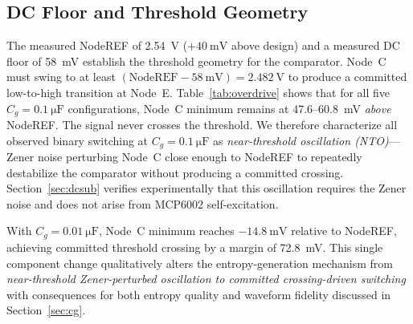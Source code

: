 \documentclass[conference]{IEEEtran}
\newcommand{\Cg}{\ensuremath{C_g}}
\begin{document}
\subsection{DC Floor and Threshold Geometry}


The measured NodeREF of \SI{2.54}{\volt} ($+\SI{40}{\milli\volt}$
above design) and a measured DC floor of \SI{58}{\milli\volt}
establish the threshold geometry for the comparator. Node~C must swing
to at least $(\text{NodeREF}-\SI{58}{\milli\volt})=\SI{2.482}{\volt}$
to produce a committed low-to-high transition at Node~E.
Table~\ref{tab:overdrive} shows that for all five
$\Cg=\SI{0.1}{\micro\farad}$ configurations, Node~C minimum remains at
47.6--60.8~mV \emph{above} NodeREF. The signal never crosses the
threshold. We therefore characterize all observed binary switching at
$\Cg=\SI{0.1}{\micro\farad}$ as \emph{near-threshold oscillation
(NTO)}---Zener noise perturbing Node~C close enough to NodeREF to
repeatedly destabilize the comparator without producing a committed
crossing. Section~\ref{sec:dcsub} verifies experimentally that this
oscillation requires the Zener noise and does not arise from MCP6002
self-excitation.

With $\Cg=\SI{0.01}{\micro\farad}$, Node~C minimum reaches
$-\SI{14.8}{\milli\volt}$ relative to NodeREF, achieving committed
threshold crossing by a margin of \SI{72.8}{\milli\volt}. This single
component change qualitatively alters the entropy-generation
mechanism from \textit{near-threshold Zener-perturbed oscillation to
committed crossing-driven switching} with consequences for both
entropy quality and waveform fidelity discussed in
Section~\ref{sec:cg}.
\end{document}
